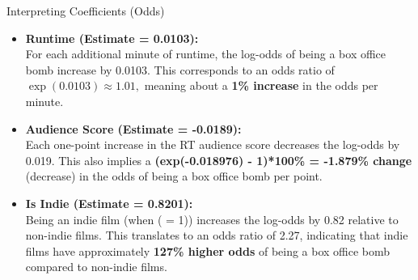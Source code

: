 \documentclass[
  10pt,
  ignorenonframetext,
]{beamer}
\begin{document}
\begin{frame}{Interpreting Coefficients (Odds)}
\label{interpreting-coefficients-odds}
\scriptsize

\begin{itemize}
\item
  \textbf{Runtime (Estimate = 0.0103):}\\
  For each additional minute of runtime, the log-odds of being a box
  office bomb increase by 0.0103. This corresponds to an odds ratio of
  \(\exp(0.0103) \approx 1.01,\) meaning about a \textbf{1\% increase}
  in the odds per minute.
\item
  \textbf{Audience Score (Estimate = -0.0189):}\\
  Each one-point increase in the RT audience score decreases the
  log-odds by 0.019. This also implies a \textbf{(exp(-0.018976) -
  1)*100\% = -1.879\% change} (decrease) in the odds of being a box
  office bomb per point.
\item
  \textbf{Is Indie (Estimate = 0.8201):}\\
  Being an indie film (when ( = 1)) increases the
  log-odds by 0.82 relative to non-indie films. This translates to an
  odds ratio of 2.27, indicating that indie films have approximately
  \textbf{127\% higher odds} of being a box office bomb compared to
  non-indie films.
\end{itemize}
\end{frame}
\end{document}
